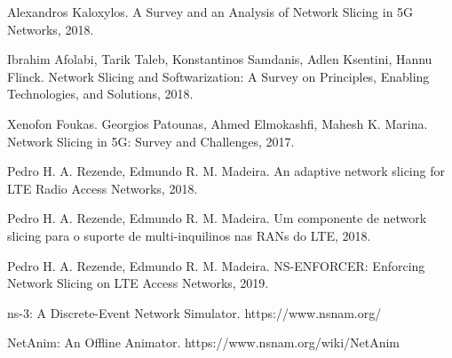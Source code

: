 \documentclass[11pt,twoside]{article}
\begin{document}
\begin{thebibliography}{99}

	Alexandros Kaloxylos. A Survey and an Analysis of Network Slicing in 5G Networks, 2018.
	
	Ibrahim Afolabi, Tarik Taleb, Konstantinos Samdanis, Adlen Ksentini, Hannu Flinck. Network Slicing and Softwarization: 
	A Survey on Principles, Enabling Technologies, and Solutions, 2018.
	
	Xenofon Foukas. Georgios Patounas, Ahmed Elmokashfi, Mahesh K. Marina. Network Slicing in 5G: Survey and Challenges, 2017.
	
	Pedro H. A. Rezende, Edmundo R. M. Madeira. An adaptive network slicing for LTE Radio Access Networks, 2018.
	
	Pedro H. A. Rezende, Edmundo R. M. Madeira. Um componente de network slicing para o suporte de multi-inquilinos nas RANs do LTE, 2018.
	
	Pedro H. A. Rezende, Edmundo R. M. Madeira. NS-ENFORCER: Enforcing Network Slicing on LTE Access Networks, 2019.
	
	ns-3: A Discrete-Event Network Simulator. https://www.nsnam.org/
	
	NetAnim: An Offline Animator. https://www.nsnam.org/wiki/NetAnim

\end{thebibliography}
\end{document}
